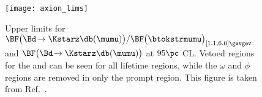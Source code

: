 
\begin{figure}
  \begin{center}
    \texttt{[image: axion\_lims]}
    \caption[Projected sensitivity in an inflaton search]
    {
      Upper limits for
      $\BF\big(\Bd\!\to\Kstarz\db(\mumu)\big) / \BF\big(\btokstrmumu\big)_{[1.1,6.0]\gevgev}$
      and $\BF\big(\Bd\!\to\Kstarz\db(\mumu)\big)$ at $95\pc$ CL.
      Vetoed regions for the \jpsi and \psitwos can be seen for all lifetime regions, while the
      $\omega$ and $\phi$ regions are removed in only the prompt region.
      This figure is taken from Ref.~\protect\cite{LHCb-PAPER-2015-036}.
    }
    \label{fig:db:excl:infl}
  \end{center}
\end{figure}








